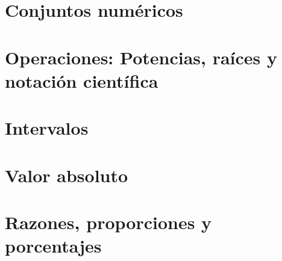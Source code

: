 
\section{Conjuntos numéricos}



\section{Operaciones: Potencias, raíces y notación científica}



\section{Intervalos}



\section{Valor absoluto}



\section{Razones, proporciones y porcentajes}

